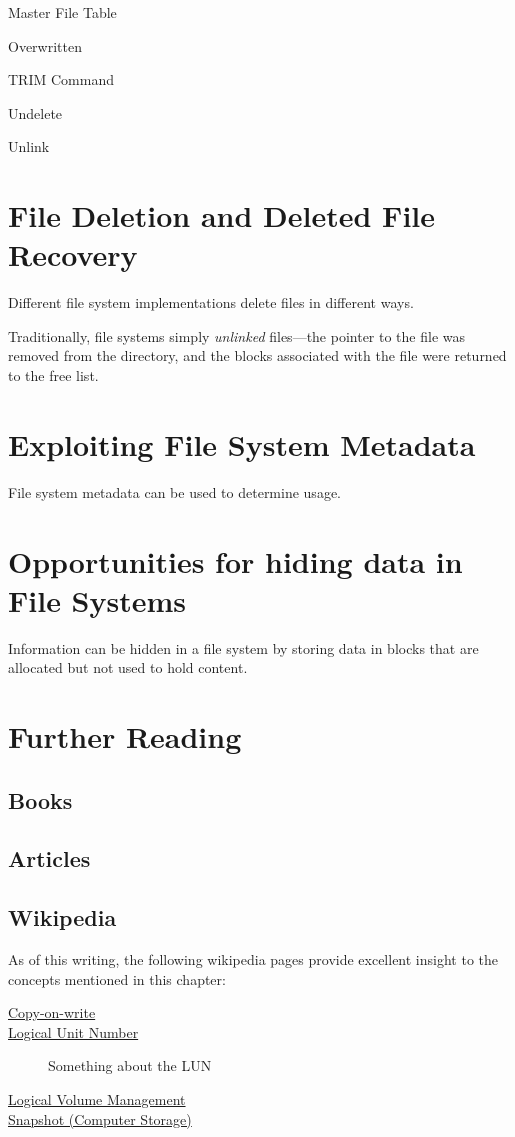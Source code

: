Master File Table

Overwritten

TRIM Command

Undelete

Unlink



\section{File Deletion and Deleted File Recovery}\label{deleted_file_recovery}
Different file system implementations delete files in different ways.

Traditionally, file systems simply \emph{unlinked} files---the pointer
to the file was removed from the directory, and the blocks associated
with the file were returned to the free list.


\section{Exploiting File System Metadata}
File system metadata can be used to determine usage. 
\cite{dfrws2011:JonathanGrier}

\section{Opportunities for hiding data in File Systems}

Information can be hidden in a file system by storing data in blocks
that are allocated but not used to hold content\cite{dfrws2005:KnutEcksteinAndMarkoJahnke}. 


\section{Further Reading}
\subsection{Books}
\subsection{Articles}
\subsection{Wikipedia}
As of this writing, the following wikipedia pages provide excellent
insight to the concepts mentioned in this chapter:

\begin{description}
\item[\href{http://en.wikipedia.org/wiki/Copy-on-write}{Copy-on-write}]
\item[\href{http://en.wikipedia.org/wiki/Logical_Unit_Number}{Logical
    Unit Number}] Something about the LUN
\item[\href{http://en.wikipedia.org/wiki/Logical_volume_management}{Logical
    Volume Management}]
\item[\href{http://en.wikipedia.org/wiki/Snapshot_(computer_storage)}{Snapshot
    (Computer Storage)}]
\end{description}


